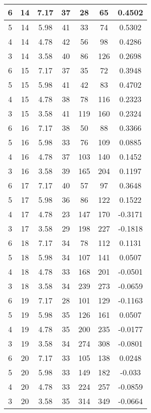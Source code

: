 \documentclass[letterpaper, 12pt]{article}
\begin{document}
\begin{longtable}{|c|c|c|c|c|c|c|}
\hline
6 & 14 & 7.17 & 37 & 28 & 65 & 0.4502 \\
\hline
5 & 14 & 5.98 & 41 & 33 & 74 & 0.5302 \\
\hline
4 & 14 & 4.78 & 42 & 56 & 98 & 0.4286 \\
\hline
3 & 14 & 3.58 & 40 & 86 & 126 & 0.2698 \\
\hline
6 & 15 & 7.17 & 37 & 35 & 72 & 0.3948 \\
\hline
5 & 15 & 5.98 & 41 & 42 & 83 & 0.4702 \\
\hline
4 & 15 & 4.78 & 38 & 78 & 116 & 0.2323 \\
\hline
3 & 15 & 3.58 & 41 & 119 & 160 & 0.2324 \\
\hline
6 & 16 & 7.17 & 38 & 50 & 88 & 0.3366 \\
\hline
5 & 16 & 5.98 & 33 & 76 & 109 & 0.0885 \\
\hline
4 & 16 & 4.78 & 37 & 103 & 140 & 0.1452 \\
\hline
3 & 16 & 3.58 & 39 & 165 & 204 & 0.1197 \\
\hline
6 & 17 & 7.17 & 40 & 57 & 97 & 0.3648 \\
\hline
5 & 17 & 5.98 & 36 & 86 & 122 & 0.1522 \\
\hline
4 & 17 & 4.78 & 23 & 147 & 170 & -0.3171 \\
\hline
3 & 17 & 3.58 & 29 & 198 & 227 & -0.1818 \\
\hline
6 & 18 & 7.17 & 34 & 78 & 112 & 0.1131 \\
\hline
5 & 18 & 5.98 & 34 & 107 & 141 & 0.0507 \\
\hline
4 & 18 & 4.78 & 33 & 168 & 201 & -0.0501 \\
\hline
3 & 18 & 3.58 & 34 & 239 & 273 & -0.0659 \\
\hline
6 & 19 & 7.17 & 28 & 101 & 129 & -0.1163 \\
\hline
5 & 19 & 5.98 & 35 & 126 & 161 & 0.0507 \\
\hline
4 & 19 & 4.78 & 35 & 200 & 235 & -0.0177 \\
\hline
3 & 19 & 3.58 & 34 & 274 & 308 & -0.0801 \\
\hline
6 & 20 & 7.17 & 33 & 105 & 138 & 0.0248 \\
\hline
5 & 20 & 5.98 & 33 & 149 & 182 & -0.033 \\
\hline
4 & 20 & 4.78 & 33 & 224 & 257 & -0.0859 \\
\hline
3 & 20 & 3.58 & 35 & 314 & 349 & -0.0664 \\
\hline
\end{longtable}
\end{document}
